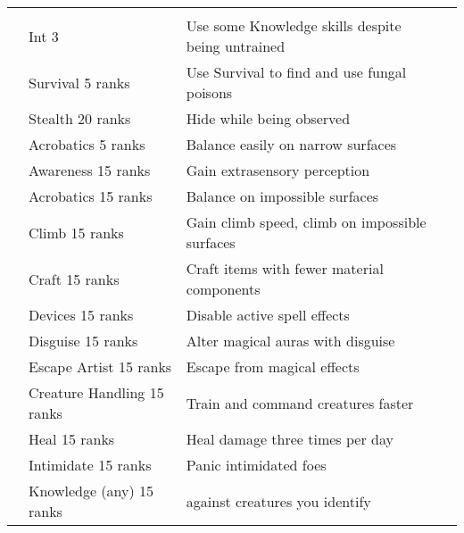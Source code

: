 \begin{longtabuwrapper}
\begin{longtabu}{>{\lcol}p{10em} >{\lcol}p{15em} >{\lcol}X >{\lcol}p{3em}}
        \midrule
         &  &  &  \\
         & Int 3 & Use some Knowledge skills despite being untrained &  \\
         & Survival 5 ranks & Use Survival to find and use fungal poisons &  \\
         & Stealth 20 ranks & Hide while being observed &  \\
         & Acrobatics 5 ranks & Balance easily on narrow surfaces &  \\
         & Awareness 15 ranks & Gain extrasensory perception &  \\
         & Acrobatics 15 ranks & Balance on impossible surfaces &  \\
         & Climb 15 ranks & Gain climb speed, climb on impossible surfaces &  \\
         & Craft 15 ranks & Craft items with fewer material components &  \\
         & Devices 15 ranks & Disable active spell effects &  \\
         & Disguise 15 ranks & Alter magical auras with disguise &  \\
         & Escape Artist 15 ranks & Escape from magical effects &  \\
         & Creature Handling 15 ranks & Train and command creatures faster &  \\
         & Heal 15 ranks & Heal damage three times per day &  \\
         & Intimidate 15 ranks & Panic intimidated foes &  \\
         & Knowledge (any) 15 ranks &  against creatures you identify &  \\

\end{longtabu}
\end{longtabuwrapper}
